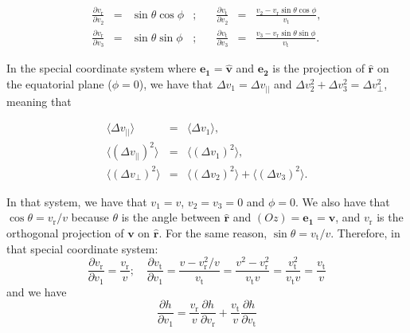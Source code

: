 \documentclass[11pt]{article}
\newcommand{\rt}{\mathrm{t}}
\newcommand{\rr}{\mathrm{r}}
\newcommand{\vr}{v_{\rr}}
\newcommand{\vt}{v_{\rt}}
\newcommand{\bv}{\boldsymbol{v}}
\newcommand{\br}{\boldsymbol{r}}
\newcommand{\hr}{\hat{\br}}
\newcommand{\dvPar}{\Delta v_{||}}
\newcommand{\dvPerp}{\Delta v_{\perp}}
\newcommand{\dvParAvrLoc}{\langle \dvPar \rangle}
\newcommand{\dvParSqAvrLoc}{\langle(\dvPar)^{2}\rangle}
\newcommand{\dvPerpSqAvrLoc}{\langle(\dvPerp)^{2}\rangle}
\newcommand{\e}[1]{\boldsymbol{e_{#1}}}
\newcommand{\hv}{\hat{\bv}}
\begin{document}
\begin{appendices}
\begin{equation}
\begin{array}{cclcccl}
 \displaystyle{\frac{\partial\vr}{\partial v_{2}}}&=& \displaystyle{\sin\theta \cos\phi} &;\quad& \displaystyle{\frac{\partial \vt}{\partial v_{2}}} &=& \displaystyle{\frac{v_{2}-\vr\sin\theta\cos\phi}{\vt}}, \\

 \displaystyle{\frac{\partial\vr}{\partial v_{3}}}&=& \displaystyle{\sin\theta \sin\phi} &;\quad& \displaystyle{\frac{\partial \vt}{\partial v_{3}}} &=& \displaystyle{\frac{v_{3}-\vr\sin\theta\sin\phi}{\vt}} .
 
\end{array}
\label{eq:dvdv1}
\end{equation}

In the special coordinate system where $\e1=\hv$ and $\e2$
is the projection of $\hr$ on the equatorial plane ($\phi=0$),
we have that $\Delta v_{1}=\dvPar$ and $\Delta v_{2}^{2}+\Delta v_{3}^{2}=\dvPerp^{2}$,
meaning that

\begin{equation}
\begin{array}{ccl}
  \dvParAvrLoc&=& \displaystyle{\langle\Delta v_{1}\rangle} ,\\

  \dvParSqAvrLoc&=& \displaystyle{\langle(\Delta v_{1})^{2}\rangle} ,\\

  \dvPerpSqAvrLoc &=& \displaystyle{\langle(\Delta v_{2})^{2}\rangle+\langle(\Delta v_{3})^{2}\rangle} .
\end{array}
\label{eq:SpecialCoordSys_LocDiffCoeffs}
\end{equation}

In that system, we have that $v_{1}=v$, $v_{2}=v_{3}=0$ and $\phi=0$. We
also have that $\cos\theta=\vr/v$ because $\theta$ is the angle
between $\hr$ and $(Oz)=\e1=\hv$, and $\vr$ is
the orthogonal projection of $\bv$ on $\hr$. For
the same reason, $\sin\theta=\vt/v$. Therefore, in that special coordinate
system:
\begin{equation}
\frac{\partial \vr}{\partial v_{1}}=\frac{\vr}{v};\quad\frac{\partial \vt}{\partial v_{1}}=\frac{v-\vr^{2}/v}{\vt}=\frac{v^{2}-\vr^{2}}{\vt v}=\frac{\vt^{2}}{\vt v}=\frac{\vt}{v}
\label{eq:SpecialCoord_dvd1}
\end{equation}
and we have
\begin{equation}
\frac{\partial h}{\partial v_{1}}=\frac{\vr}{v}\frac{\partial h}{\partial \vr}+\frac{\vt}{v}\frac{\partial h}{\partial \vt}
\label{eq:SpecialCoord_dhdv1}
\end{equation}


\end{appendices}
\end{document}
